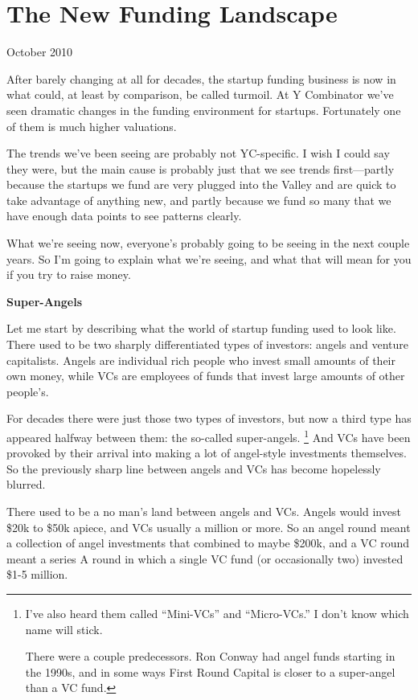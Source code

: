 \documentclass[12pt]{book}
\begin{document}
\chapter{The New Funding Landscape}

October 2010

After barely changing at all for decades, the startup funding business
is now in what could, at least by comparison, be called turmoil. At Y
Combinator we've seen dramatic changes in the funding environment for
startups. Fortunately one of them is much higher valuations.

The trends we've been seeing are probably not YC-specific. I wish I
could say they were, but the main cause is probably just that we see
trends first---partly because the startups we fund are very plugged into
the Valley and are quick to take advantage of anything new, and partly
because we fund so many that we have enough data points to see patterns
clearly.

What we're seeing now, everyone's probably going to be seeing in the
next couple years. So I'm going to explain what we're seeing, and what
that will mean for you if you try to raise money.

\textbf{Super-Angels}

Let me start by describing what the world of startup funding used to
look like. There used to be two sharply differentiated types of
investors: angels and venture capitalists. Angels are individual rich
people who invest small amounts of their own money, while VCs are
employees of funds that invest large amounts of other people's.

For decades there were just those two types of investors, but now a
third type has appeared halfway between them: the so-called
super-angels. \footnote{I've also heard them called ``Mini-VCs'' and ``Micro-VCs.'' I
don't know which name will stick.

There were a couple predecessors. Ron Conway had angel funds starting in
the 1990s, and in some ways First Round Capital is closer to a
super-angel than a VC fund.} And VCs have been provoked by
their arrival into making a lot of angel-style investments themselves.
So the previously sharp line between angels and VCs has become
hopelessly blurred.

There used to be a no man's land between angels and VCs. Angels would
invest \$20k to \$50k apiece, and VCs usually a million or more. So an
angel round meant a collection of angel investments that combined to
maybe \$200k, and a VC round meant a series A round in which a single VC
fund (or occasionally two) invested \$1-5 million.
\end{document}
